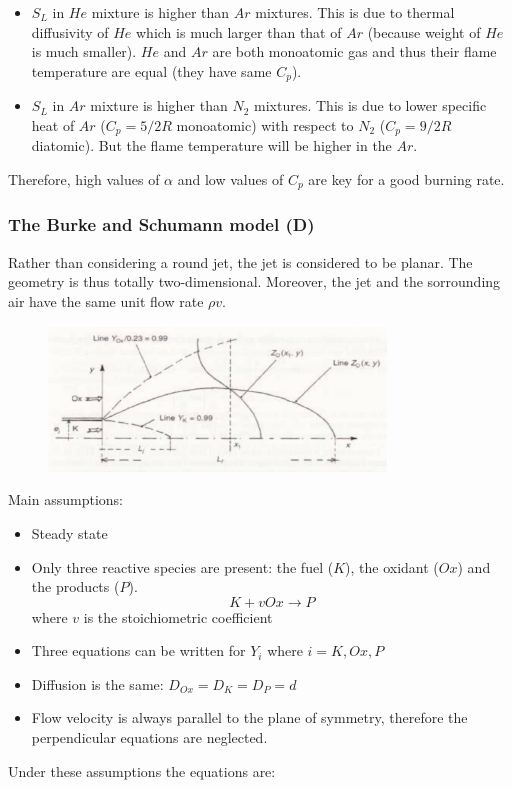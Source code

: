 \documentclass[12pt]{article}
\begin{document}
\begin{itemize}
    \item $S_{L}$ in $He$ mixture is higher than $Ar$ mixtures. This is due to thermal diffusivity of $He$ which is much larger than that of $Ar$ (because weight of $He$ is much smaller). $He$ and $Ar$ are both monoatomic gas and thus their flame temperature are equal (they have same $C_{p}$).
    \item $S_{L}$ in $Ar$ mixture is higher than $N_{2}$ mixtures. This is due to lower specific heat of $Ar$ ($C_{p}=5/2R$ monoatomic) with respect to $N_{2}$ ($C_{p}=9/2R$ diatomic). But the flame temperature will be higher in the $Ar$.
\end{itemize}

Therefore, high values of $\alpha$ and low values of $C_{p}$ are key for a good burning rate.

\subsubsection{The Burke and Schumann model (D)}

Rather than considering a round jet, the jet is considered to be planar. The geometry is thus totally two-dimensional. Moreover, the jet and the sorrounding air have the same unit flow rate $\rho v$.

\begin{figure}[!ht]
\centering
\includegraphics[width=0.8\textwidth]{figures/burke.png}
\end{figure}

Main assumptions:
\begin{itemize}
    \item Steady state
    \item Only three reactive species are present: the fuel ($K$), the oxidant ($Ox$) and the products ($P$).
    \begin{equation}
        K + vOx \rightarrow P
    \end{equation}
    where $v$ is the stoichiometric coefficient
    \item Three equations can be written for $Y_{i}$ where $i=K,Ox,P$
    \item Diffusion is the same: $D_{Ox}=D_{K}=D_{P}=d$
    \item Flow velocity is always parallel to the plane of symmetry, therefore the perpendicular equations are neglected.
\end{itemize}
Under these assumptions the equations are:
\end{document}
